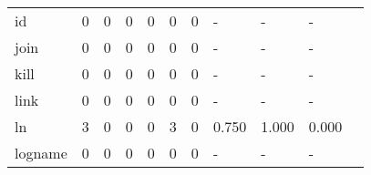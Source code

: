 \begin{longtable}{lp{1.2cm}p{1.2cm}p{1.2cm}p{1.2cm}p{1.2cm}p{1.2cm}p{1.2cm}p{1.2cm}p{1.2cm}p{1.2cm}}
id        &                                     0 &                                                  0 &                                                  0 &                                                  0 &                                                  0 &                                                  0 &                                                  - &                                                  - &                                                  - \\
join      &                                     0 &                                                  0 &                                                  0 &                                                  0 &                                                  0 &                                                  0 &                                                  - &                                                  - &                                                  - \\
kill      &                                     0 &                                                  0 &                                                  0 &                                                  0 &                                                  0 &                                                  0 &                                                  - &                                                  - &                                                  - \\
link      &                                     0 &                                                  0 &                                                  0 &                                                  0 &                                                  0 &                                                  0 &                                                  - &                                                  - &                                                  - \\
ln        &                                     3 &                                                  0 &                                                  0 &                                                  0 &                                                  3 &                                                  0 &                                              0.750 &                                              1.000 &                                              0.000 \\
logname   &                                     0 &                                                  0 &                                                  0 &                                                  0 &                                                  0 &                                                  0 &                                                  - &                                                  - &                                                  - \\

\end{longtable}
